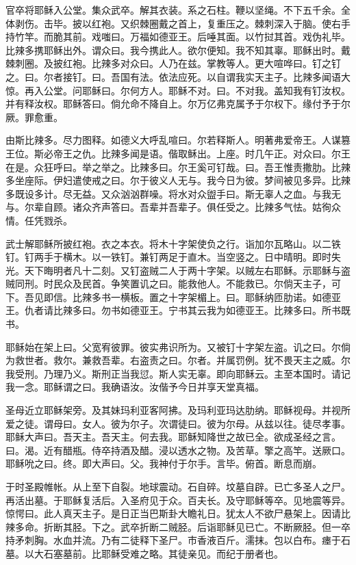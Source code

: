 \documentclass[UTF8,17pt]{ctexart}
\begin{document}
官卒将耶稣⼊公堂。集众武卒。解其⾐装。系之⽯柱。鞭以坚绳。不下五千余。全体剥伤。击毕。披以红袍。又织棘圈戴之⾸上，复重压之。棘刺深⼊于脑。使右⼿持⽵竿。⽽脆其前。戏嗤曰。万福如德亚王。后唾其⾯。以⽵挝其⾸。戏伪礼毕。⽐辣多携耶稣出外。谓众⽈。我今携此⼈。欲尔便知。我不知其辜。耶稣出时。戴棘刺圈。及披红袍。⽐辣多对众曰。⼈乃在兹。掌教等⼈。更⼤喧哗曰。钉之钉之。曰。尔者接钉。曰。吾国有法。依法应死。以⾃谓我实天主⼦。⽐辣多闻语⼤惊。再⼊公堂。问耶稣⽈。尔何⽅⼈。耶稣不对。曰。不对我。盖知我有钉汝权。并有释汝权。耶稣答曰。倘允命不降⾃上。尔万亿弗克属予于尔权下。缘付予于尔厥。罪愈重。

由斯⽐辣多。尽⼒图释。如德义⼤呼乱喧曰。尔若释斯⼈。明著弗爱帝王。⼈谋篡王位。斯必帝王之仇。⽐辣多闻是语。偕取稣出。上座。时⼏午正。对众曰。尔王在是。众狂呼曰。举之举之。⽐辣多曰。尔王奚可钉哉。曰。吾王惟责撒肋。⽐辣多坐座际。伊妇遣使戒之曰。尔于彼义⼈⽆与。我今⽇为彼。梦间被见多异。⽐辣多既设多计。尽⽆益。又众汹汹群噪。将⽔对众盥⼿曰。斯⽆辜⼈之⾎。与我⽆与。尔辈⾃顾。诸众齐声答曰。吾辈并吾辈⼦。俱任受之。⽐辣多⽓怯。姑徇众情。任凭戮杀。

武⼠解耶稣所披红袍。⾐之本⾐。将⽊⼗字架使负之⾏。诣加尔⽡略⼭。以⼆铁钉。钉两⼿于横⽊。以⼀铁钉。兼钉两⾜于直⽊。当空竖之。⽇中晴明。即时失光。天下晦明者凡⼗⼆刻。又钉盗贼⼆⼈于两⼗字架。以贼左右耶稣。⽰耶稣与盗贼同刑。时民众及民⾸。争笑置讥之曰。能救他⼈。不能救已。尔倘天主⼦，可下。吾见即信。⽐辣多书⼀横板。置之⼗字架楣上。曰。耶稣纳匝肋诺。如德亚王。仇者请⽐辣多曰。勿书如德亚王。宁书其云我为如德亚王。⽐辣多曰。所书既书。

耶稣始在架上曰。⽗宽宥彼罪。彼实弗识所为。又被钉⼗字架左盗。讥之曰。尔倘为救世者。救尔。兼救吾辈。右盗责之曰。尔者。并属罚例。犹不畏天主之威。尔我受刑。乃理乃义。斯刑正当我愆。斯⼈实⽆辜。即向耶稣云。主⾄本国时。请记我⼀念。耶稣谓之曰。我确语汝。汝偕予今⽇并享天堂真福。

圣母近⽴耶稣架旁。及其妹玛利亚客阿拂。及玛利亚玛达肋纳。耶稣视母。并视所爱之徒。谓母曰。⼥⼈。彼为尔⼦。次谓徒曰。彼为尔母。从兹以往。徒尽孝事。耶稣⼤声曰。吾天主。吾天主。何去我。耶稣知降世之故已全。欲成圣经之⾔。曰。渴。近有醋瓶。侍卒持酒及醋。浸以透⽔之物。及苦草。擎之⾼竿。送厥口。耶稣吮之⽈。终。即⼤声⽈。⽗。我神付于尔⼿。⾔毕。俯⾸。断息⽽崩。

于时圣殿帷帐。从上⾄下⾃裂。地球震动。⽯⾃碎。坟墓⾃辟。已亡多圣⼈之⼫。再活出墓。于耶稣复活后。⼊圣府见于众。百夫长。及守耶稣等卒。见地震等异。惊愕曰。此⼈真天主⼦。是⽇正当巴斯卦⼤瞻礼⽇。犹太⼈不欲⼫悬架上。因请⽐辣多命。折断其胫。下之。武卒折断⼆贼胫。后诣耶稣见已亡。不断厥胫。但⼀卒持⽭刺胸。⽔⾎并流。乃有⼆徒释下圣⼫。市⾹液百⽄。濡抹。包以⽩布。瘗于⽯墓。以⼤⽯塞墓前。⽐耶稣受难之略。其徒亲见。⽽纪于册者也。\Cross
\end{document}
